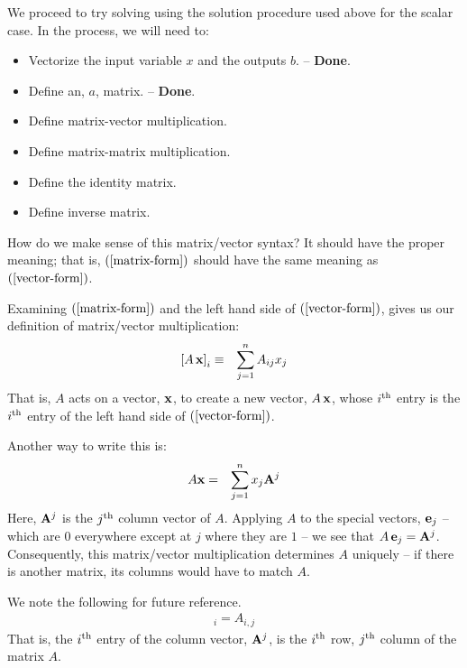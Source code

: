 \documentclass{article}
\begin{document}
We proceed to try solving using the solution procedure used above for the scalar case.
In the process, we will need to:
\begin{itemize}
    \item{Vectorize the input variable $x$ and the outputs $b$. -- {\bf Done}.}
    \item{Define an, $a$, matrix. -- {\bf Done}.}
    \item{Define matrix-vector multiplication.}
    \item{Define matrix-matrix multiplication.}
    \item{Define the identity matrix.}
    \item{Define inverse matrix.}
\end{itemize}

How do we make sense of this matrix/vector syntax? It should have
the proper meaning; that is, $(\ref{matrix-form})$
should have the same meaning as $(\ref{vector-form})$.

Examining $(\ref{matrix-form})$ and the left hand side of
$(\ref{vector-form})$, gives us our definition of matrix/vector multiplication:
\begin{eqnarray}
  \left[A \, {\bf x}\right]_i & \equiv & \sum_{j=1}^n A_{ij} x_j
                                         \label{matrix-vector-mult}
\end{eqnarray}
That is, $A$ acts on a vector, ${\bf x}$, to create a new vector, $A \, {\bf x}$,
whose $i^{\rm th}$ entry is the $i^{\rm th}$ entry of
the left hand side of $(\ref{vector-form})$.

Another way to write this is:
\begin{eqnarray}
  A {\bf x} & = & \sum_{j=1}^n x_j {\bf A}^j
\end{eqnarray}
Here, ${\bf A}^j$ is the $j^{\rm th}$ column vector of $A$. Applying $A$ to the special
vectors, ${\bf e}_j$
-- which are $0$ everywhere except at $j$ where they are $1$ --
we see that $A \, {\bf e}_j = {\bf A}^j$. 
Consequently, this matrix/vector
multiplication determines $A$ uniquely
-- if there is another matrix, its columns would have to match $A$.

We note the following for future reference.
\begin{eqnarray}
	[{\bf A}^j]_i = A_{i, j} \label{vec-matrix-index}
\end{eqnarray}
That is, the $i^{\rm th}$ entry of the column vector, ${\bf A}^j$, is the
$i^{\rm th}$ row,  $j^{\rm th}$ column of the matrix $A$. 
\end{document}
